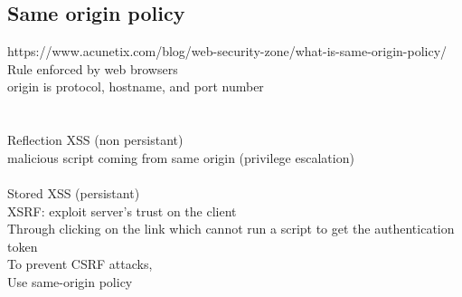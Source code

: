 \documentclass[11pt]{article}
\begin{document}
\begin{multicols*}{3}
\subsection*{Same origin policy}
\textcolor{link}{https://www.acunetix.com/blog/web-security-zone/what-is-same-origin-policy/}
\\
Rule enforced by web browsers\\
origin is protocol,  hostname, and port number\\\\
\\Reflection XSS (non persistant)\\
malicious script coming from same origin (privilege escalation)\\
\\Stored XSS (persistant)
\\
XSRF: exploit server's trust on the client\\
Through clicking on the link which cannot run a script to get the authentication token
\\
To prevent CSRF attacks,\\
Use same-origin policy\\
\end{multicols*}
\end{document}
